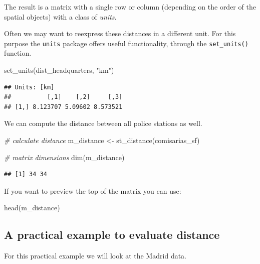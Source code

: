 \documentclass[
]{book}
\makeatletter
\newenvironment{Shaded}{\begin{snugshade}}{\end{snugshade}}
\newcommand{\CommentTok}[1]{\textcolor[rgb]{0.37,0.37,0.37}{\textit{#1}}}
\newcommand{\FunctionTok}[1]{\textcolor[rgb]{0,0,0}{#1}}
\newcommand{\NormalTok}[1]{#1}
\newcommand{\OtherTok}[1]{\textcolor[rgb]{0.37,0.37,0.37}{#1}}
\newcommand{\StringTok}[1]{\textcolor[rgb]{0.5,0.5,0.5}{#1}}
\newenvironment{kframe}{%
\medskip{}
\setlength{\fboxsep}{.8em}
 \def\at@end@of@kframe{}%
 \ifinner\ifhmode%
  \def\at@end@of@kframe{\end{minipage}}%
  \begin{minipage}{\columnwidth}%
 \fi\fi%
 \def\FrameCommand##1{\hskip\@totalleftmargin \hskip-\fboxsep
 \colorbox{shadecolor}{##1}\hskip-\fboxsep
     \hskip-\linewidth \hskip-\@totalleftmargin \hskip\columnwidth}%
 \MakeFramed {\advance\hsize-\width
   \@totalleftmargin\z@ \linewidth\hsize
   \@setminipage}}%
 {\par\unskip\endMakeFramed%
 \at@end@of@kframe}
\renewenvironment{Shaded}{\begin{kframe}}{\end{kframe}}
\makeatother
\begin{document}
The result is a matrix with a single row or column (depending on the order of the spatial objects) with a class of \emph{units}.

Often we may want to reexpress these distances in a different unit. For this purpose the \texttt{units} package offers useful functionality, through the \texttt{set\_units()} function.

\begin{Shaded}
\begin{Highlighting}[]
\FunctionTok{set\_units}\NormalTok{(dist\_headquarters, }\StringTok{"km"}\NormalTok{)}
\end{Highlighting}
\end{Shaded}

\begin{verbatim}
## Units: [km]
##          [,1]    [,2]     [,3]
## [1,] 8.123707 5.09602 8.573521
\end{verbatim}

We can compute the distance between all police stations as well.

\begin{Shaded}
\begin{Highlighting}[]
\CommentTok{\# calculate distance}
\NormalTok{m\_distance }\OtherTok{\textless{}{-}} \FunctionTok{st\_distance}\NormalTok{(comisarias\_sf)}

\CommentTok{\# matrix dimensions}
\FunctionTok{dim}\NormalTok{(m\_distance)}
\end{Highlighting}
\end{Shaded}

\begin{verbatim}
## [1] 34 34
\end{verbatim}

If you want to preview the top of the matrix you can use:

\begin{Shaded}
\begin{Highlighting}[]
\FunctionTok{head}\NormalTok{(m\_distance)}
\end{Highlighting}
\end{Shaded}

\hypertarget{a-practical-example-to-evaluate-distance}{%
\subsection{A practical example to evaluate distance}\label{a-practical-example-to-evaluate-distance}}

For this practical example we will look at the Madrid data.
\end{document}
